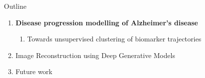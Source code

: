 \documentclass[8pt,xcolor=table,aspectratio=169]{beamer}
\begin{document}
\begin{frame}{Outline}

\begin{enumerate}
 \item \textbf{Disease progression modelling of Alzheimer's disease}
 \begin{enumerate} 
  \item Towards unsupervised clustering of biomarker trajectories\\
 \end{enumerate}
   
 
  
  \vt

 \item Image Reconstruction using Deep Generative Models\\
\brgmoursshort
\vt
 
  \item Future work\\

\end{enumerate}
\end{frame}



\end{document}
